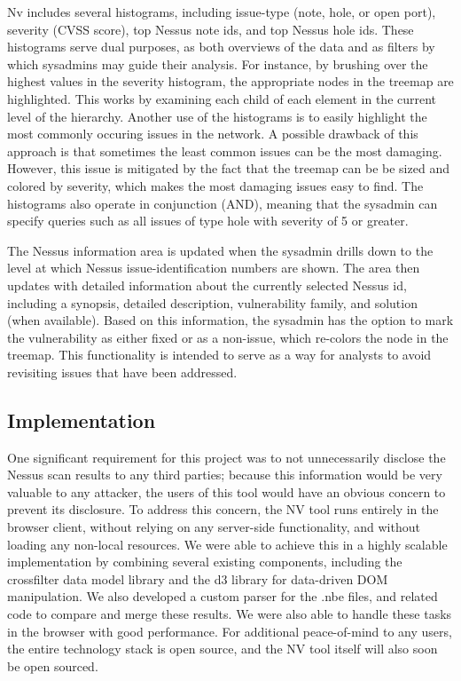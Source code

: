 \documentclass{acm_proc_article-sp}
\begin{document}
Nv includes several histograms, including issue-type (note, hole, or open port), severity (CVSS score), top Nessus note ids, and top Nessus hole ids.
These histograms serve dual purposes, as both overviews of the data and as filters by which sysadmins may guide their analysis.
For instance, by brushing over the highest values in the severity histogram, the appropriate nodes in the treemap are highlighted.
This works by examining each child of each element in the current level of the hierarchy.
Another use of the histograms is to easily highlight the most commonly occuring issues in the network.
A possible drawback of this approach is that sometimes the least common issues can be the most damaging.
However, this issue is mitigated by the fact that the treemap can be be sized and colored by severity, which makes the most damaging issues easy to find.
The histograms also operate in conjunction (AND), meaning that the sysadmin can specify queries such as all issues of type hole with severity of 5 or greater.

The Nessus information area is updated when the sysadmin drills down to the level at which Nessus issue-identification numbers are shown.
The area then updates with detailed information about the currently selected Nessus id, including a synopsis, detailed description, vulnerability family, and solution (when available).
Based on this information, the sysadmin has the option to mark the vulnerability as either fixed or as a non-issue, which re-colors the node in the treemap.
This functionality is intended to serve as a way for analysts to avoid revisiting issues that have been addressed.


\subsection{Implementation}

One significant requirement for this project was to not unnecessarily disclose the Nessus scan results to any third parties; because this information would be very valuable to any attacker, the users of this tool would have an obvious concern to prevent its disclosure.
To address this concern, the NV tool runs entirely in the browser client, without relying on any server-side functionality, and without loading any non-local resources.
We were able to achieve this in a highly scalable implementation by combining several existing components, including the crossfilter data model library and the d3 library for data-driven DOM manipulation.
We also developed a custom parser for the .nbe files, and related code to compare and merge these results.
 We were also able to handle these tasks in the browser with good performance.
For additional peace-of-mind to any users, the entire technology stack is open source, and the NV tool itself will also soon be open sourced.
\end{document}
